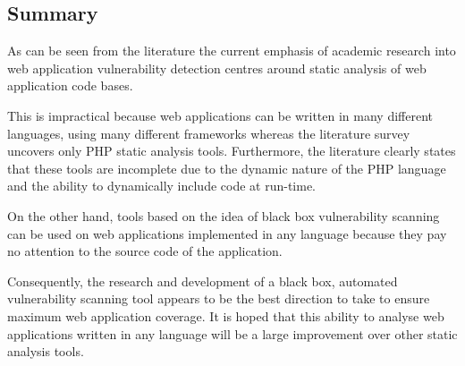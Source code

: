 \documentclass[12pt,a4paper]{article}
\begin{document}
\subsection{Summary}
As can be seen from the literature the current emphasis of academic research into web application vulnerability detection centres around static analysis of web application code bases.

This is impractical because web applications can be written in many different languages, using many different frameworks whereas the literature survey uncovers only PHP static analysis tools.  Furthermore, the literature clearly states that these tools are incomplete due to the dynamic nature of the PHP language and the ability to dynamically include code at run-time.

On the other hand, tools based on the idea of black box vulnerability scanning can be used on web applications implemented in any language because they pay no attention to the source code of the application.

Consequently, the research and development of a black box, automated vulnerability scanning tool appears to be the best direction to take to ensure maximum web application coverage.  It is hoped that this ability to analyse web applications written in any language will be a large improvement over other static analysis tools.
\end{document}

